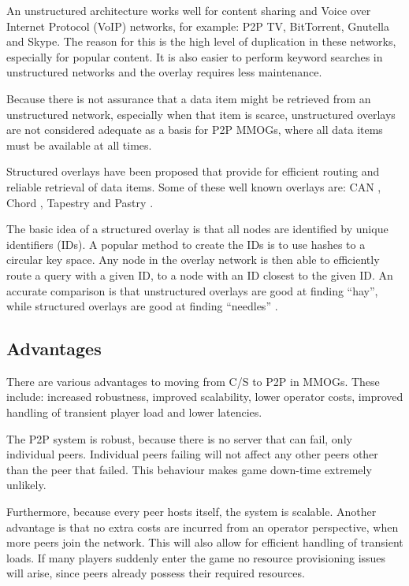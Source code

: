 \documentclass[10pt,a4paper,journal,cspaper,compsoc]{IEEEtran}
\begin{document}
An unstructured architecture works well for content sharing and Voice over Internet Protocol (VoIP) networks, for example: P2P TV, BitTorrent,
Gnutella and Skype. The reason for this is the high level of duplication in these networks, especially for popular content. It is also easier to
perform keyword searches in unstructured networks and the overlay requires less maintenance.

Because there is not assurance that a data item might be retrieved from an unstructured network, especially when that item is scarce, unstructured
overlays are not considered adequate as a basis for P2P MMOGs, where all data items must be available at all times.

Structured overlays have been proposed that provide for efficient routing and reliable retrieval of data items. Some of these well known overlays
are: CAN \cite{CAN}, Chord \cite{chord}, Tapestry \cite{tapestry} and Pastry \cite{pastry}.

The basic idea of a structured overlay is that all nodes are identified by unique identifiers (IDs). A popular method to create the IDs is to use
hashes to a circular key space. Any node in the overlay network is then able to efficiently route a query with a given ID, to a node with an ID
closest to the given ID. An accurate comparison is that unstructured overlays are good at finding ``hay'', while structured overlays are good at
finding ``needles'' \cite{Rodrigues_acm_comms_p2p}.


\subsection{Advantages}
\label{p2p_advantages}

There are various advantages to moving from C/S to P2P in MMOGs. These include: increased robustness, improved scalability, lower operator costs,
improved handling of transient player load and lower latencies.

The P2P system is robust, because there is no server that can fail, only individual peers. Individual peers failing will not affect any other peers
other than the peer that failed. This behaviour makes game down-time extremely unlikely.

Furthermore, because every peer hosts itself, the system is scalable. Another advantage is that no extra costs are incurred from an operator
perspective, when more peers join the network. This will also allow for efficient handling of transient loads. If many players suddenly enter the
game no resource provisioning issues will arise, since peers already possess their required resources.
\end{document}
